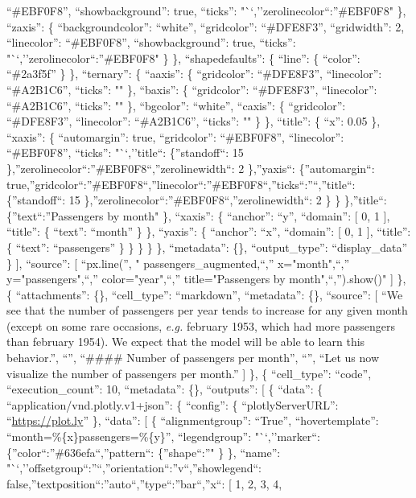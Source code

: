 \documentclass[
]{article}
\begin{document}
``\#EBF0F8'', ``showbackground'': true, ``ticks'':
"``,''zerolinecolor``:''\#EBF0F8" \}, ``zaxis'': \{ ``backgroundcolor'':
``white'', ``gridcolor'': ``\#DFE8F3'', ``gridwidth'': 2, ``linecolor'':
``\#EBF0F8'', ``showbackground'': true, ``ticks'':
"``,''zerolinecolor``:''\#EBF0F8" \} \}, ``shapedefaults'': \{ ``line'':
\{ ``color'': ``\#2a3f5f'' \} \}, ``ternary'': \{ ``aaxis'': \{
``gridcolor'': ``\#DFE8F3'', ``linecolor'': ``\#A2B1C6'', ``ticks'': ""
\}, ``baxis'': \{ ``gridcolor'': ``\#DFE8F3'', ``linecolor'':
``\#A2B1C6'', ``ticks'': "" \}, ``bgcolor'': ``white'', ``caxis'': \{
``gridcolor'': ``\#DFE8F3'', ``linecolor'': ``\#A2B1C6'', ``ticks'': ""
\} \}, ``title'': \{ ``x'': 0.05 \}, ``xaxis'': \{ ``automargin'': true,
``gridcolor'': ``\#EBF0F8'', ``linecolor'': ``\#EBF0F8'', ``ticks'':
"``,''title``: \{''standoff``: 15
\},''zerolinecolor``:''\#EBF0F8``,''zerolinewidth``: 2 \},''yaxis``:
\{''automargin``:
true,''gridcolor``:''\#EBF0F8``,''linecolor``:''\#EBF0F8``,''ticks``:''``,''title``:
\{''standoff``: 15 \},''zerolinecolor``:''\#EBF0F8``,''zerolinewidth``:
2 \} \} \},''title``: \{''text``:''Passengers by month" \}, ``xaxis'':
\{ ``anchor'': ``y'', ``domain'': {[} 0, 1 {]}, ``title'': \{ ``text'':
``month'' \} \}, ``yaxis'': \{ ``anchor'': ``x'', ``domain'': {[} 0, 1
{]}, ``title'': \{ ``text'': ``passengers'' \} \} \} \} \},
``metadata'': \{\}, ``output\_type'': ``display\_data'' \} {]},
``source'': {[} ``px.line(\n'', " passengers\_augmented,\n``,''
x="month",\n``,'' y="passengers",\n``,'' color="year",\n``,''
title="Passengers by month",\n``,'').show()\n" {]} \}, \{
``attachments'': \{\}, ``cell\_type'': ``markdown'', ``metadata'': \{\},
``source'': {[} ``We see that the number of passengers per year tends to
increase for any given month (except on some rare occasions, \emph{e.g.}
february 1953, which had more passengers than february 1954). We expect
that the model will be able to learn this behavior.\n'', ``\n'',
``\#\#\#\# Number of passengers per month\n'', ``\n'', ``Let us now
visualize the number of passengers per month.\n'' {]} \}, \{
``cell\_type'': ``code'', ``execution\_count'': 10, ``metadata'': \{\},
``outputs'': {[} \{ ``data'': \{ ``application/vnd.plotly.v1+json'': \{
``config'': \{ ``plotlyServerURL'': ``\url{https://plot.ly}'' \},
``data'': {[} \{ ``alignmentgroup'': ``True'', ``hovertemplate'':
``month=\%\{x\}passengers=\%\{y\}'', ``legendgroup'': "``,''marker``:
\{''color``:''\#636efa``,''pattern``: \{''shape``:''" \} \}, ``name'':
"``,''offsetgroup``:''``,''orientation``:''v``,''showlegend``:
false,''textposition``:''auto``,''type``:''bar``,''x``: {[} 1, 2, 3, 4,
\end{document}
